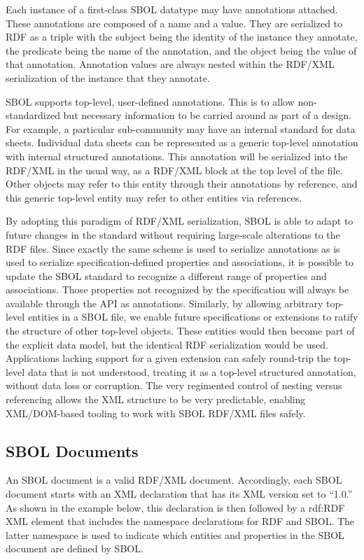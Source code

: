 Each instance of a first-class SBOL datatype may have annotations attached. These annotations are composed of a name and a value.  They are serialized to RDF as a triple with the subject being the identity of the instance they annotate, the predicate being the name of the annotation, and the object being the value of that annotation. Annotation values are always nested within the RDF/XML serialization of the instance that they annotate.

SBOL supports top-level, user-defined annotations. This is to allow non-standardized but necessary information to be carried around as part of a design. For example, a particular sub-community may have an internal standard for data sheets. Individual data sheets can be represented as a generic top-level annotation with internal structured annotations. This annotation will be serialized into the RDF/XML in the usual way, as a RDF/XML block at the top level of the file. Other objects may refer to this entity through their annotations by reference, and this generic top-level entity may refer to other entities via references.

By adopting this paradigm of RDF/XML serialization, SBOL is able to adapt to future changes in the standard without requiring large-scale alterations to the RDF files. Since exactly the same scheme is used to serialize annotations as is used to serialize specification-defined properties and associations, it is possible to update the SBOL standard to recognize a different range of properties and associations. Those properties not recognized by the specification will always be available through the API as annotations. Similarly, by allowing arbitrary top-level entities in a SBOL file, we enable future specifications or extensions to ratify the structure of other top-level objects. These entities would then become part of the explicit data model, but the identical RDF serialization would be used. Applications lacking support for a given extension can safely round-trip the top-level data that is not understood, treating it as a top-level structured annotation, without data loss or corruption. The very regimented control of nesting versus referencing allows the XML structure to be very predictable, enabling XML/DOM-based tooling to work with SBOL RDF/XML files safely.

\subsection {SBOL Documents}
An SBOL document is a valid RDF/XML document. Accordingly, each SBOL document starts with an XML declaration that has its XML version set to ``1.0.'' As shown in the example below, this declaration is then followed by a rdf:RDF XML element that includes the namespace declarations for RDF and SBOL. The latter namespace is used to indicate which entities and properties in the SBOL document are defined by SBOL.

